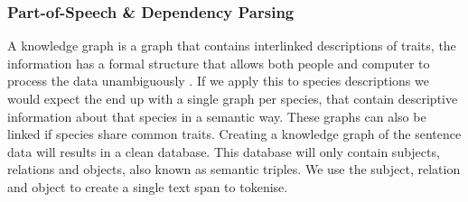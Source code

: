 \documentclass[a4paper, 12pt, oneside]{book} %
\begin{document}
\subsubsection{Part-of-Speech \& Dependency Parsing} \label{par:PoS}
A knowledge graph is a graph that contains interlinked descriptions of traits, the information has a formal structure that allows both people and computer to process the data unambiguously \autocite{petkova_crafting_2020}.
If we apply this to species descriptions we would expect the end up with a single graph per species, that contain descriptive information about that species in a semantic way.
These graphs can also be linked if species share common traits.
Creating a knowledge graph of the sentence data will results in a clean database.
This database will only contain subjects, relations and objects, also known as semantic triples. 
We use the subject, relation and object to create a single text span to tokenise.
\end{document}
